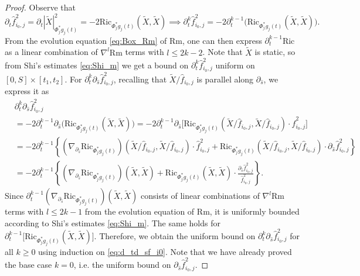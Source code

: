\documentclass[11pt]{amsart}
\theoremstyle{plain}
\numberwithin{equation}{section}
\theoremstyle{definition}
\theoremstyle{remark}
\begin{document}
\begin{proof}
Observe that
\[\partial_t \hat{f}_{i_0,j}^2 = \partial_t |\widetilde{X}|^2_{\Phi_j^*g_j(t)}= -2\textrm{Ric}_{\Phi_j^*g_j(t)}(\widetilde{X},\widetilde{X}) \implies \partial_t^k \hat{f}_{i_0,j}^2 =-2\partial_t^{k-1}\big(\textrm{Ric}_{\Phi_j^*g_j(t)}(\widetilde{X},\widetilde{X})\big).\]
From the evolution equation \eqref{eq:Box_Rm} of $\textrm{Rm}$, one can then express $\partial_t^{k-1}\textrm{Ric}$ as a linear combination of $\nabla^l\textrm{Rm}$ terms with $l \leq 2k-2$. Note that $\widetilde{X}$ is static, so from Shi's estimates \eqref{eq:Shi_m} we get a bound on $\partial_t^k\hat{f}_{i_0,j}^2$ uniform on $[0,S] \times [t_1,t_2]$. For $\partial_t^k\partial_{\hat{s}}\hat{f}_{i_0,j}^2$, recalling that $\widetilde{X}/\hat{f}_{i_0,j}$ is parallel along $\partial_{\hat{s}}$, we express it as
\begin{align}
& \partial_t^k \partial_{\hat{s}}\hat{f}_{i_0,j}^2 \label{eq:d_td_sf_i0}\\
 & = -2\partial_t^{k-1}\partial_{\hat{s}}\big(\textrm{Ric}_{\Phi_j^*g_j(t)}(\widetilde{X},\widetilde{X})\big) = -2\partial_t^{k-1}\partial_{\hat{s}}\big[\textrm{Ric}_{\Phi_j^*g_j(t)}(\widetilde{X}/\hat{f}_{i_0,j},\widetilde{X}/\hat{f}_{i_0,j})\cdot \hat{f}_{i_0,j}^2\big]\nonumber\\
& = -2\partial_t^{k-1}\left\{(\nabla_{\partial_{\hat{s}}}\textrm{Ric}_{\Phi_j^*g_j(t)})(\widetilde{X}/\hat{f}_{i_0,j},\widetilde{X}/\hat{f}_{i_0,j}) \cdot \hat{f}_{i_0,j}^2 + \textrm{Ric}_{\Phi_j^*g_j(t)}(\widetilde{X}/\hat{f}_{i_0,j},\widetilde{X}/\hat{f}_{i_0,j}) \cdot \partial_{\hat{s}}\hat{f}_{i_0,j}^2\right\}\nonumber\\
& = -2\partial_t^{k-1}\left\{(\nabla_{\partial_{\hat{s}}}\textrm{Ric}_{\Phi_j^*g_j(t)})(\widetilde{X},\widetilde{X})  + \textrm{Ric}_{\Phi_j^*g_j(t)}(\widetilde{X},\widetilde{X}) \cdot \frac{\partial_{\hat{s}}\hat{f}_{i_0,j}^2}{\hat{f}_{i_0,j}^2}\right\}.\nonumber
\end{align}
Since $\partial_t^{k-1}(\nabla_{\partial_{\hat{s}}}\textrm{Ric}_{\Phi_j^*g_j(t)})(\widetilde{X},\widetilde{X})$ consists of linear combinations of $\nabla^l \textrm{Rm}$ terms with $l \leq 2k-1$ from the evolution equation of $\textrm{Rm}$, it is uniformly bounded according to Shi's estimates \eqref{eq:Shi_m}. The same holds for $\partial_t^{k-1}\big[\textrm{Ric}_{\Phi_j^*g_j(t)}(\widetilde{X},\widetilde{X})\big]$. Therefore, we obtain the uniform bound on $\partial_t^k\partial_{\hat{s}}\hat{f}_{i_0,j}^2$ for all $k \geq 0$ using induction on \eqref{eq:d_td_sf_i0}. Note that we have already proved the base case $k=0$, i.e. the uniform bound on $\partial_{\hat{s}}\hat{f}_{i_0,j}^2$.


\end{proof}
\end{document}

